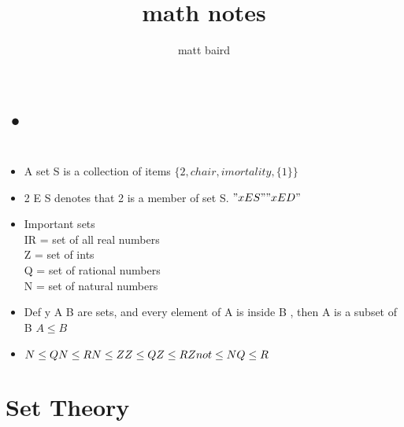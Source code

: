 \documentclass[10pt,letterpaper]{report}
\author{matt baird}
\title{math notes }
\begin{document}
\maketitle
\chapter{•}
\chapter{}
\section{}
\begin{itemize}
\item A set S is a collection of items $ \{2,chair,imortality , \{1\}\}$
\item 2 E S denotes that 2 is a member of set S. $"xES" \\"xED"$
\item Important sets \\ IR = set of all real numbers \\ Z = set of ints \\ Q = set of rational numbers \\ N = set of natural numbers
\item Def y A  B are sets, and every element of A is inside B , then A is a subset of B  $A \leq B$
\item $N\leq Q\\N\leq R \\N\leq Z \\Z \leq Q\\Z \leq R \\Z not \leq N \\ Q \leq R $
\end{itemize}
\chapter{Set Theory}
\end{document}
